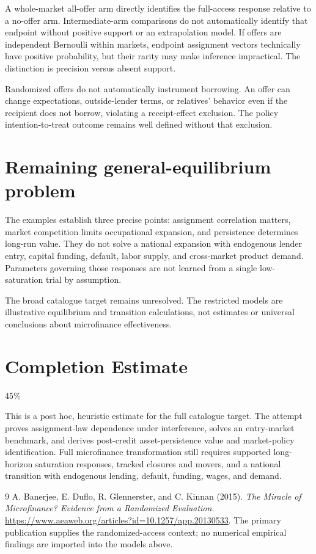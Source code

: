 \documentclass[11pt,a4paper]{article}
\begin{document}
A whole-market all-offer arm directly identifies the full-access response relative to a no-offer arm. Intermediate-arm comparisons do not automatically identify that endpoint without positive support or an extrapolation model. If offers are independent Bernoulli within markets, endpoint assignment vectors technically have positive probability, but their rarity may make inference impractical. The distinction is precision versus absent support.

Randomized offers do not automatically instrument borrowing. An offer can change expectations, outside-lender terms, or relatives' behavior even if the recipient does not borrow, violating a receipt-effect exclusion. The policy intention-to-treat outcome remains well defined without that exclusion.
\section{Remaining general-equilibrium problem}
The examples establish three precise points: assignment correlation matters, market competition limits occupational expansion, and persistence determines long-run value. They do not solve a national expansion with endogenous lender entry, capital funding, default, labor supply, and cross-market product demand. Parameters governing those responses are not learned from a single low-saturation trial by assumption.

The broad catalogue target remains unresolved. The restricted models are illustrative equilibrium and transition calculations, not estimates or universal conclusions about microfinance effectiveness.

\section{Completion Estimate}
45\%

This is a post hoc, heuristic estimate for the full catalogue target.
The attempt proves assignment-law dependence under interference, solves an entry-market benchmark, and derives post-credit asset-persistence value and market-policy identification. Full microfinance transformation still requires supported long-horizon saturation responses, tracked closures and movers, and a national transition with endogenous lending, default, funding, wages, and demand.

\begin{thebibliography}{9}
 A. Banerjee, E. Duflo, R. Glennerster, and C. Kinnan (2015).
\emph{The Miracle of Microfinance? Evidence from a Randomized Evaluation}.
\url{https://www.aeaweb.org/articles?id=10.1257/app.20130533}.
The primary publication supplies the randomized-access context; no numerical empirical findings are imported into the models above.
\end{thebibliography}
\end{document}

